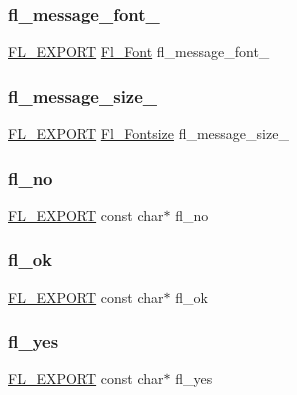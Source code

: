 \subsubsection{\texorpdfstring{fl\+\_\+message\+\_\+font\+\_\+}{fl\_message\_font\_}}
{\footnotesize\ttfamily \hyperlink{_fl___export_8_h_aa9ba29a18aee9d738370a06eeb4470fc}{F\+L\+\_\+\+E\+X\+P\+O\+RT} \hyperlink{_enumerations_8_h_a2ac46d9f082834b969fffe490a03a709}{Fl\+\_\+\+Font} fl\+\_\+message\+\_\+font\+\_\+}

\mbox{\label{fl__ask_8_h_a5dd951d7162e37c13e0ead53a32362fb}} 
\subsubsection{\texorpdfstring{fl\+\_\+message\+\_\+size\+\_\+}{fl\_message\_size\_}}
{\footnotesize\ttfamily \hyperlink{_fl___export_8_h_aa9ba29a18aee9d738370a06eeb4470fc}{F\+L\+\_\+\+E\+X\+P\+O\+RT} \hyperlink{_enumerations_8_h_ad58927f5c691454480f7cd28362502f1}{Fl\+\_\+\+Fontsize} fl\+\_\+message\+\_\+size\+\_\+}

\mbox{\label{fl__ask_8_h_a60a03e49d8cd4afb2f9822ca65213b0c}} 
\subsubsection{\texorpdfstring{fl\+\_\+no}{fl\_no}}
{\footnotesize\ttfamily \hyperlink{_fl___export_8_h_aa9ba29a18aee9d738370a06eeb4470fc}{F\+L\+\_\+\+E\+X\+P\+O\+RT} const char$\ast$ fl\+\_\+no}

\mbox{\label{fl__ask_8_h_a239425fc19b3a025ae60b6b3f39131e5}} 
\subsubsection{\texorpdfstring{fl\+\_\+ok}{fl\_ok}}
{\footnotesize\ttfamily \hyperlink{_fl___export_8_h_aa9ba29a18aee9d738370a06eeb4470fc}{F\+L\+\_\+\+E\+X\+P\+O\+RT} const char$\ast$ fl\+\_\+ok}

\mbox{\label{fl__ask_8_h_a2c91c15b1fb79a033ca9b8fb18b22c02}} 
\subsubsection{\texorpdfstring{fl\+\_\+yes}{fl\_yes}}
{\footnotesize\ttfamily \hyperlink{_fl___export_8_h_aa9ba29a18aee9d738370a06eeb4470fc}{F\+L\+\_\+\+E\+X\+P\+O\+RT} const char$\ast$ fl\+\_\+yes}

